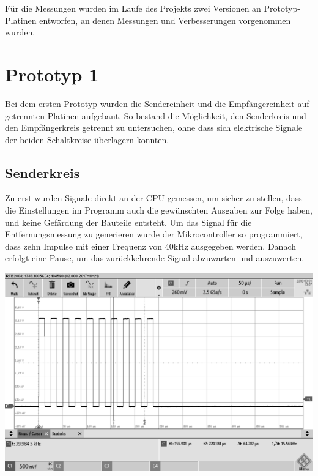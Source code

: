 Für die Messungen wurden im Laufe des Projekts zwei Versionen an Prototyp-Platinen entworfen, an denen Messungen und Verbesserungen vorgenommen wurden. 
\section{Prototyp 1}
Bei dem ersten Prototyp wurden die Sendereinheit und die Empfängereinheit auf getrennten Platinen aufgebaut. So bestand die Möglichkeit, den Senderkreis und den Empfängerkreis getrennt zu untersuchen, ohne dass sich elektrische Signale der beiden Schaltkreise überlagern konnten.

\subsection{Senderkreis}
Zu erst wurden Signale direkt an der CPU gemessen, um sicher zu stellen, dass die Einstellungen im Programm auch die gewünschten Ausgaben zur Folge haben, und keine Gefärdung der Bauteile entsteht.
Um das Signal für die Entfernungsmessung zu generieren wurde der Mikrocontroller so programmiert, dass zehn Impulse mit einer Frequenz von 40kHz ausgegeben werden. Danach erfolgt eine Pause, um das zurückkehrende Signal abzuwarten und auszuwerten.\\
\begin{minipage}{0.5\textwidth}
\includegraphics[width=1\textwidth%
]{Abbildungen/MessungenP1/PWM-von-der-cpu.png}
\label{fig:pwm-burst}
\end{minipage}
